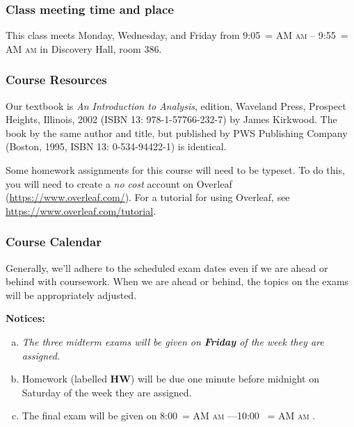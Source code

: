 \documentclass[12pt]{article}
\makeatletter
\newcounter{ex}\setcounter{ex}{0}
\newenvironment{alphalist}{
  \begin{enumerate}[(a)]
    \addtolength{\itemsep}{-0.5\itemsep}}
  {\end{enumerate}}
\DeclareRobustCommand{\maybefakesc}[1]{%
  \ifnum\pdfstrcmp{\f@series}{\bfdefault}=\z@
    {\fontsize{\dimexpr0.8\dimexpr\f@size pt\relax}{0}\selectfont\uppercase{#1}}%
  \else
    \textsc{#1}%
  \fi
}
\newcommand\AM{\,\maybefakesc{am}\xspace}
\newcommand{\room}{Discovery Hall, room  386}
\newcommand{\meetingtime}{This class meets Monday, Wednesday, and Friday  from 
	9:05\AM -- 9:55\AM}
\newcommand{\finaldateandtime}{\printdate{13/12/\the\year} 8:00\AM{}---10:00 \AM}
\makeatother
\begin{document}
\subsubsection*{Class meeting time and place}

\meetingtime in \room.

\subsubsection*{Course Resources}

Our textbook is \emph{An Introduction to Analysis},  edition, Waveland Press, Prospect Heights, Illinois, 2002 (ISBN 13: 978-1-57766-232-7) by James Kirkwood. The book by the same author and title, but published by PWS Publishing Company (Boston, 1995, ISBN 13:
0-534-94422-1) is identical.

 Some homework assignments for this course will need to be typeset. To do this, you will need to create a \emph{no cost} 
account on Overleaf (\url{https://www.overleaf.com/}).   For a  tutorial for using Overleaf, see \url{https://www.overleaf.com/tutorial}.



\subsubsection*{Course Calendar}

Generally, we'll adhere to the scheduled exam dates even if we are ahead or behind with coursework.  
When we are ahead or behind, the topics on the exams will be appropriately adjusted.  


\vspace{0.1in}
\noindent \textbf{Notices:}


\begin{alphalist}
   \item \emph{The three midterm exams will be given on  \textbf{Friday} of the week they are assigned.}
   
    \item Homework (labelled \textbf{HW}) will be due one minute before midnight on  Saturday of the week they are assigned.  

    \item The final exam will be given on \finaldateandtime.
    
\end{alphalist}

\vspace{0.1in}
\end{document}
